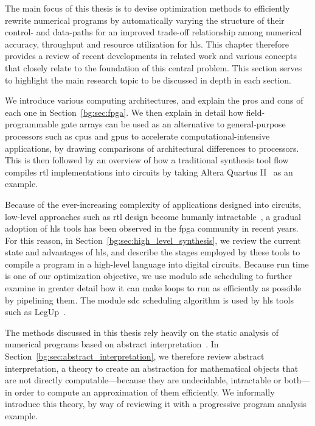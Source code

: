 The main focus of this thesis is to devise optimization methods to efficiently
rewrite numerical programs by automatically varying the structure of their
control- and data-paths for an improved trade-off relationship among numerical
accuracy, throughput and resource utilization for \gls{hls}\@.  This chapter
therefore provides a review of recent developments in related work and various
concepts that closely relate to the foundation of this central problem.  This
section serves to highlight the main research topic to be discussed in depth in
each section.

We introduce various computing architectures, and explain the pros and
cons of each one in Section~\ref{bg:sec:fpga}.  We then explain in detail
how field-programmable gate arrays can be used as an alternative to
general-purpose processors such as \glspl{cpu} and \glspl{gpu} to accelerate
computational-intensive applications, by drawing comparisons of architectural
differences to processors.  This is then followed by an overview of how a
traditional synthesis tool flow compiles \gls{rtl} implementations into
circuits by taking Altera Quartus II~\cite{quartus} as an example.

Because of the ever-increasing complexity of applications designed into
circuits, low-level approaches such as \gls{rtl} design become humanly
intractable~\cite{gajski}, a gradual adoption of \gls{hls} tools has been
observed in the \gls{fpga} community in recent years.  For this reason, in
Section~\ref{bg:sec:high_level_synthesis}, we review the current state and
advantages of \gls{hls}, and describe the stages employed by these tools to
compile a program in a high-level language into digital circuits.  Because
run time is one of our optimization objective, we use modulo \gls{sdc}
scheduling to further examine in greater detail how it can make loops to run as
efficiently as possible by pipelining them.  The module \gls{sdc} scheduling
algorithm is used by \gls{hls} tools such as LegUp~\cite{legup}.

The methods discussed in this thesis rely heavily on the static analysis of
numerical programs based on abstract interpretation~\cite{cousot77}.  In
Section~\ref{bg:sec:abstract_interpretation}, we therefore review abstract
interpretation, a theory to create an abstraction for mathematical objects that
are not directly computable---because they are undecidable, intractable or
both---in order to compute an approximation of them efficiently.  We informally
introduce this theory, by way of reviewing it with a progressive program
analysis example.

